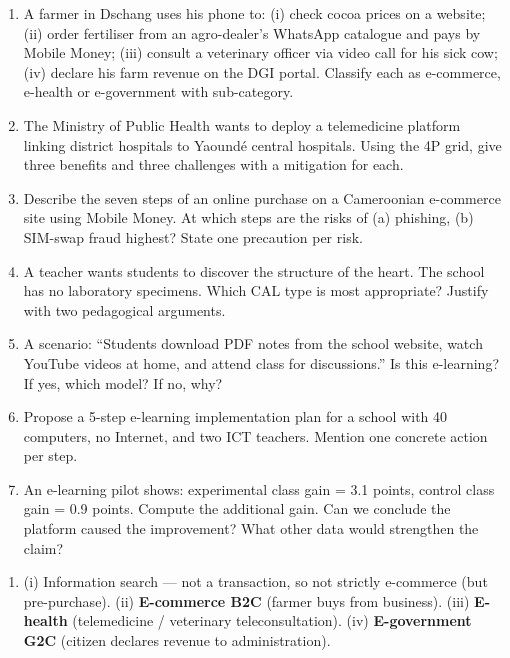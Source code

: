 \documentclass[11pt]{article}
\begin{document}
\begin{exercice}
\begin{enumerate}
\item A farmer in Dschang uses his phone to: (i) check cocoa prices on a website; (ii) order fertiliser from an agro-dealer's WhatsApp catalogue and pays by Mobile Money; (iii) consult a veterinary officer via video call for his sick cow; (iv) declare his farm revenue on the DGI portal. Classify each as e-commerce, e-health or e-government with sub-category.
\item The Ministry of Public Health wants to deploy a telemedicine platform linking district hospitals to Yaoundé central hospitals. Using the 4P grid, give three benefits and three challenges with a mitigation for each.
\item Describe the seven steps of an online purchase on a Cameroonian e-commerce site using Mobile Money. At which steps are the risks of (a) phishing, (b) SIM-swap fraud highest? State one precaution per risk.
\item A teacher wants students to discover the structure of the heart. The school has no laboratory specimens. Which CAL type is most appropriate? Justify with two pedagogical arguments.
\item A scenario: ``Students download PDF notes from the school website, watch YouTube videos at home, and attend class for discussions.'' Is this e-learning? If yes, which model? If no, why?
\item Propose a 5-step e-learning implementation plan for a school with 40 computers, no Internet, and two ICT teachers. Mention one concrete action per step.
\item An e-learning pilot shows: experimental class gain = 3.1 points, control class gain = 0.9 points. Compute the additional gain. Can we conclude the platform caused the improvement? What other data would strengthen the claim?
\end{enumerate}
\end{exercice}

\begin{corrige}[Exercise 1]
\begin{enumerate}
\item (i) Information search — not a transaction, so not strictly e-commerce (but pre-purchase). (ii) \textbf{E-commerce B2C} (farmer buys from business). (iii) \textbf{E-health} (telemedicine / veterinary teleconsultation). (iv) \textbf{E-government G2C} (citizen declares revenue to administration).
\end{enumerate}
\end{corrige}
\end{document}
